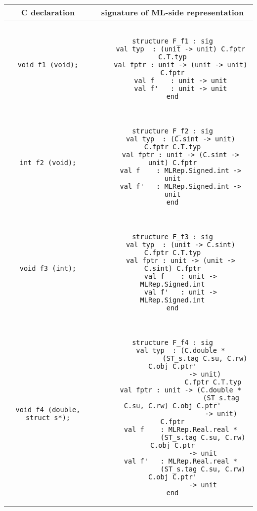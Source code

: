 \documentclass[titlepage,letterpaper]{article}
\begin{document}
\begin{small}
\begin{center}
\begin{tabular}{c|c}
C declaration & signature of ML-side representation \\ \hline\hline
{\tt void f1 (void);}
&
\begin{minipage}{4in}
\begin{verbatim}

structure F_f1 : sig
    val typ  : (unit -> unit) C.fptr C.T.typ
    val fptr : unit -> (unit -> unit) C.fptr
    val f    : unit -> unit
    val f'   : unit -> unit
end

\end{verbatim}
\end{minipage}
\\ \hline
{\tt int f2 (void);}
&
\begin{minipage}{4in}
\begin{verbatim}

structure F_f2 : sig
    val typ  : (C.sint -> unit) C.fptr C.T.typ
    val fptr : unit -> (C.sint -> unit) C.fptr
    val f    : MLRep.Signed.int -> unit
    val f'   : MLRep.Signed.int -> unit
end

\end{verbatim}
\end{minipage}
\\ \hline
{\tt void f3 (int);}
&
\begin{minipage}{4in}
\begin{verbatim}

structure F_f3 : sig
    val typ  : (unit -> C.sint) C.fptr C.T.typ
    val fptr : unit -> (unit -> C.sint) C.fptr
    val f    : unit -> MLRep.Signed.int
    val f'   : unit -> MLRep.Signed.int
end

\end{verbatim}
\end{minipage}
\\ \hline
{\tt void f4 (double, struct s*);}
&
\begin{minipage}{4in}
\begin{verbatim}

structure F_f4 : sig
    val typ  : (C.double *
                (ST_s.tag C.su, C.rw) C.obj C.ptr'
                -> unit)
                    C.fptr C.T.typ
    val fptr : unit -> (C.double *
                        (ST_s.tag C.su, C.rw) C.obj C.ptr'
                        -> unit) C.fptr
    val f    : MLRep.Real.real *
               (ST_s.tag C.su, C.rw) C.obj C.ptr
               -> unit
    val f'   : MLRep.Real.real *
               (ST_s.tag C.su, C.rw) C.obj C.ptr'
               -> unit
end

\end{verbatim}
\end{minipage}
\end{tabular}
\end{center}
\end{small}
\end{document}
